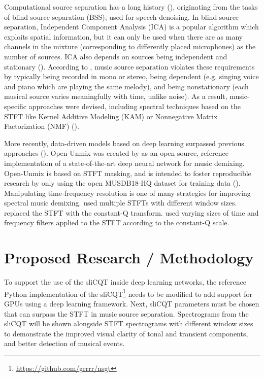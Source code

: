 \documentclass[letter,12pt]{article}
\begin{document}
Computational source separation has a long history (\cite{musicsepintro1}), originating from the tasks of blind source separation (BSS), used for speech denoising. In blind source separation, Independent Component Analysis (ICA) is a popular algorithm which exploits spatial information, but it can only be used when there are as many channels in the mixture (corresponding to differently placed microphones) as the number of sources. ICA also depends on sources being independent and stationary (\cite{musicsepintro1}). According to \textcite{musicsepintro1}, music source separation violates these requirements by typically being recorded in mono or stereo, being dependent (e.g. singing voice and piano which are playing the same melody), and being nonstationary (each musical source varies meaningfully with time, unlike noise). As a result, music-specific approaches were devised, including spectral techniques based on the STFT like Kernel Additive Modeling (KAM) or Nonnegative Matrix Factorization (NMF) (\cite{musicsepgood}).

More recently, data-driven models based on deep learning surpassed previous approaches (\cite{sisec2018}). Open-Unmix was created by \textcite{umx} as an open-source, reference implementation of a state-of-the-art deep neural network for music demixing. Open-Unmix is based on STFT masking, and is intended to foster reproducible research by only using the open MUSDB18-HQ dataset for training data (\cite{musdb18hq}). Manipulating time-frequency resolution is one of many strategies for improving spectral music demixing. \textcite{driedger} used multiple STFTs with different window sizes. \textcite{fitzgerald2} replaced the STFT with the constant-Q transform. \textcite{plumbley2} used varying sizes of time and frequency filters applied to the STFT according to the constant-Q scale.

\section{Proposed Research / Methodology}

To support the use of the sliCQT inside deep learning networks, the reference Python implementation of the sliCQT\footnote{\url{https://github.com/grrrr/nsgt}} needs to be modified to add support for GPUs using a deep learning framework. Next, sliCQT parameters must be chosen that can surpass the STFT in music source separation. Spectrograms from the sliCQT will be shown alongside STFT spectrograms with different window sizes to demonstrate the improved visual clarity of tonal and transient components, and better detection of musical events.
\end{document}
